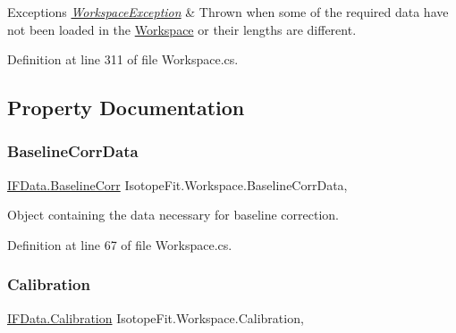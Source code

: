 \begin{DoxyExceptions}{Exceptions}
{\em \hyperlink{class_isotope_fit_1_1_workspace_exception}{Workspace\+Exception}} & Thrown when some of the required data have not been loaded in the \hyperlink{class_isotope_fit_1_1_workspace}{Workspace} or their lengths are different.\\
\hline
\end{DoxyExceptions}


Definition at line 311 of file Workspace.\+cs.



\subsection{Property Documentation}
\mbox{\label{class_isotope_fit_1_1_workspace_a700395fbb329b1a0fcb5932095db066f}} 
\subsubsection{\texorpdfstring{Baseline\+Corr\+Data}{BaselineCorrData}}
{\footnotesize\ttfamily \hyperlink{class_isotope_fit_1_1_i_f_data_1_1_baseline_corr}{I\+F\+Data.\+Baseline\+Corr} Isotope\+Fit.\+Workspace.\+Baseline\+Corr\+Data\hspace{0.3cm}{\ttfamily [get]}, {\ttfamily [set]}}



Object containing the data necessary for baseline correction. 



Definition at line 67 of file Workspace.\+cs.

\mbox{\label{class_isotope_fit_1_1_workspace_a0ed1cfd6701db24de84f4ba67eed0442}} 
\subsubsection{\texorpdfstring{Calibration}{Calibration}}
{\footnotesize\ttfamily \hyperlink{class_isotope_fit_1_1_i_f_data_1_1_calibration}{I\+F\+Data.\+Calibration} Isotope\+Fit.\+Workspace.\+Calibration\hspace{0.3cm}{\ttfamily [get]}, {\ttfamily [set]}}



